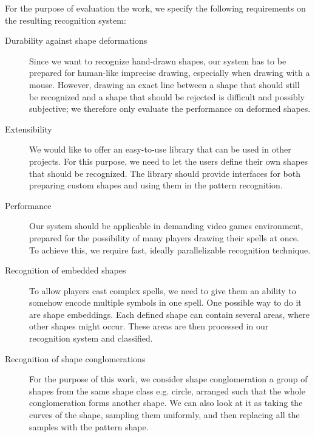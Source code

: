 For the purpose of evaluation the work, we specify the following requirements on the resulting recognition system:
\begin{description}

\item [Durability against shape deformations]
\sloppypar Since we want to recognize hand-drawn shapes, our system has to be prepared for human-like imprecise drawing, especially when drawing with a mouse. However, drawing an exact line between a shape that should still be recognized and a shape that should be rejected is difficult and possibly subjective; we therefore only evaluate the performance on deformed shapes.

\item [Extensibility]
We would like to offer an easy-to-use library that can be used in other projects. For this purpose, we need to let the users define their own shapes that should be recognized. The library should provide interfaces for both preparing custom shapes and using them in the pattern recognition.

\item [Performance]
Our system should be applicable in demanding video games environment, prepared for the possibility of many players drawing their spells at once. To achieve this, we require fast, ideally parallelizable recognition technique.

\item [Recognition of embedded shapes]
To allow players cast complex spells, we need to give them an ability to somehow encode multiple symbols in one spell. One possible way to do it are shape embeddings. Each defined shape can contain several areas, where other shapes might occur. These areas are then processed in our recognition system and classified.

\item [Recognition of shape conglomerations]
For the purpose of this work, we consider shape conglomeration a group of shapes from the same shape class e.g. circle, arranged such that the whole conglomeration forms another shape. We can also look at it as taking the curves of the shape, sampling them uniformly, and then replacing all the samples with the pattern shape.
\end{description}

